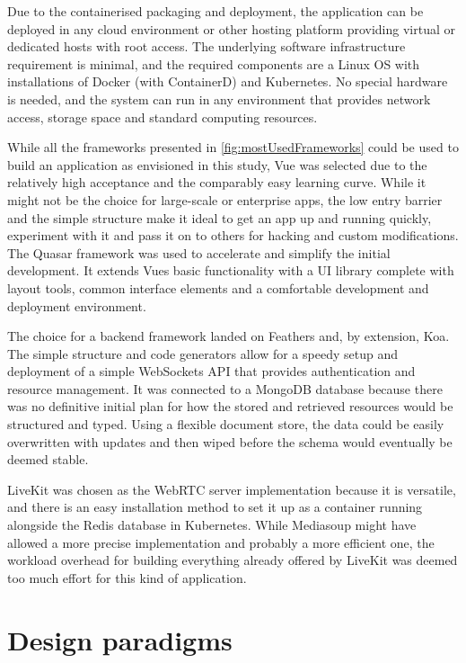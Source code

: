 Due to the containerised packaging and deployment, the application can be deployed in any cloud environment or other hosting platform providing virtual or dedicated hosts with root access.
The underlying software infrastructure requirement is minimal, and the required components are a Linux \ac{OS} with installations of Docker (with ContainerD) and Kubernetes.
No special hardware is needed, and the system can run in any environment that provides network access, storage space and standard computing resources.

While all the frameworks presented in \autoref{fig:mostUsedFrameworks} could be used to build an application as envisioned in this study, Vue was selected due to the relatively high acceptance and the comparably easy learning curve.
While it might not be the choice for large-scale or enterprise apps, the low entry barrier and the simple structure make it ideal to get an app up and running quickly, experiment with it and pass it on to others for hacking and custom modifications.
The Quasar framework was used to accelerate and simplify the initial development.
It extends Vue\textquotesingle s basic functionality with a \ac{UI} library complete with layout tools, common interface elements and a comfortable development and deployment environment.

The choice for a backend framework landed on Feathers and, by extension, Koa.
The simple structure and code generators allow for a speedy setup and deployment of a simple WebSockets \ac{API} that provides authentication and resource management.
It was connected to a MongoDB database because there was no definitive initial plan for how the stored and retrieved resources would be structured and typed.
Using a flexible document store, the data could be easily overwritten with updates and then wiped before the schema would eventually be deemed stable.

LiveKit was chosen as the WebRTC server implementation because it is versatile, and there is an easy installation method to set it up as a container running alongside the Redis database in Kubernetes.
While Mediasoup might have allowed a more precise implementation and probably a more efficient one, the workload overhead for building everything already offered by LiveKit was deemed too much effort for this kind of application.

\section{Design paradigms}
\label{sec:design-paradigms}

